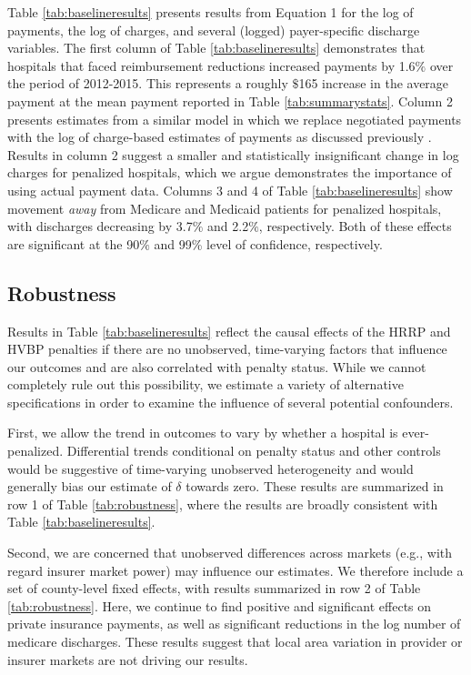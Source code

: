 \documentclass[12pt]{article}
\begin{document}
Table \ref{tab:baselineresults} presents results from Equation 1 for the log of payments, the log of charges, and several (logged) payer-specific discharge variables. The first column of Table \ref{tab:baselineresults} demonstrates that hospitals that faced reimbursement reductions increased payments by 1.6$\%$ over the period of 2012-2015.  This represents a roughly $\$$165 increase in the average payment at the mean payment reported in Table \ref{tab:summarystats}.  Column 2 presents estimates from a similar model in which we replace negotiated payments with the log of charge-based estimates of payments as discussed previously \citep{dafny2009,lewis2015,schmitt2017,dranove2017}. Results in column 2 suggest a smaller and statistically insignificant change in log charges for penalized hospitals, which we argue demonstrates the importance of using actual payment data.  Columns 3 and 4 of Table \ref{tab:baselineresults} show movement \textit{away} from Medicare and Medicaid patients for penalized hospitals, with discharges decreasing by 3.7$\%$ and 2.2$\%$, respectively.  Both of these effects are significant at the 90$\%$ and 99\% level of confidence, respectively.

\subsection{Robustness}
Results in Table \ref{tab:baselineresults} reflect the causal effects of the HRRP and HVBP penalties if there are no unobserved, time-varying factors that influence our outcomes and are also correlated with penalty status.  While we cannot completely rule out this possibility, we estimate a variety of alternative specifications in order to examine the influence of several potential confounders.

First, we allow the trend in outcomes to vary by whether a hospital is ever-penalized. Differential trends conditional on penalty status and other controls would be suggestive of time-varying unobserved heterogeneity and would generally bias our estimate of $\delta$ towards zero.  These results are summarized in row 1 of Table \ref{tab:robustness}, where the results are broadly consistent with Table \ref{tab:baselineresults}.

Second, we are concerned that unobserved differences across markets (e.g., with regard insurer market power) may influence our estimates. We therefore include a set of county-level fixed effects, with results summarized in row 2 of Table \ref{tab:robustness}. Here, we continue to find positive and significant effects on private insurance payments, as well as significant reductions in the log number of medicare discharges. These results suggest that local area variation in provider or insurer markets are not driving our results.
\end{document}
